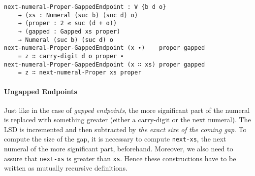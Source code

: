 \documentclass[\main/thesis.tex]{subfiles}
\begin{document}
\begin{lstlisting}[basicstyle=\ttfamily\scriptsize]
next-numeral-Proper-GappedEndpoint : ∀ {b d o}
    → (xs : Numeral (suc b) (suc d) o)
    → (proper : 2 ≤ suc (d + o))
    → (gapped : Gapped xs proper)
    → Numeral (suc b) (suc d) o
next-numeral-Proper-GappedEndpoint (x ∙)    proper gapped
    = z ∷ carry-digit d o proper ∙
next-numeral-Proper-GappedEndpoint (x ∷ xs) proper gapped
    = z ∷ next-numeral-Proper xs proper
\end{lstlisting}

\paragraph{Ungapped Endpoints}

\begin{center}
    \begin{adjustbox}{max width=\textwidth}
    \end{adjustbox}
\end{center}

Just like in the case of \textit{gapped endpoints}, the more significant part
of the numeral is replaced with something greater (either a carry-digit or
the next numeral).
The LSD is incremented and then subtracted by \textit{the exact size of the coming gap}.
To compute the size of the gap, it is necessary to compute {\lstinline|next-xs|},
the next numeral of the more significant part, beforehand.
Moreover, we also need to assure that {\lstinline|next-xs|} is greater than
{\lstinline|xs|}.
Hence these constructions have to be written as mutually recursive definitions.
\end{document}
